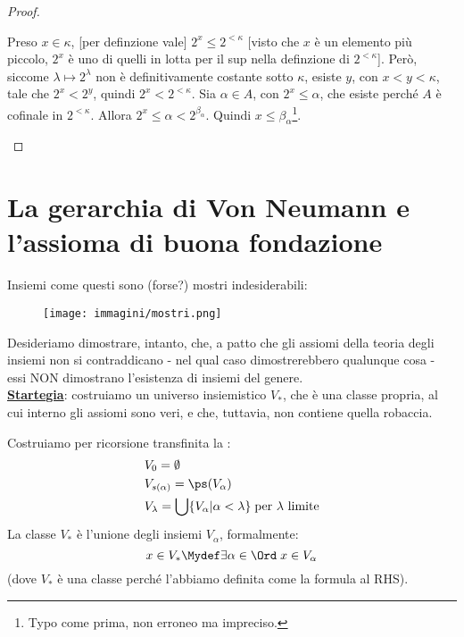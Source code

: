 \documentclass[11pt]{scrartcl}
\begin{document}
\begin{proof}
\begin{itemize}
\begin{itemize}
			Preso $x \in \kappa$, [per definzione vale] $2^{x} \leq 2^{<\kappa}$ [visto che $x$ è un elemento più piccolo, $2^x$ è uno di quelli in lotta per il sup nella definzione di $2^{<\kappa}$]. Però, siccome $\lambda \mapsto 2^\lambda$ non è definitivamente costante sotto $\kappa$, esiste $y$, con $x < y < \kappa$, tale che $2^x < 2^y$,
			quindi $2^{x} < 2^{<\kappa}$. Sia $\alpha \in A$, con $2^x \leq \alpha$, che esiste perché $A$ è cofinale in $2^{<\kappa}$. Allora $2^x \leq \alpha < 2^{\beta_\alpha}$. Quindi $x \leq \beta_\alpha$\footnote{Typo come prima, non erroneo ma impreciso.}.
		\end{itemize}
	\end{itemize}
\end{proof}


\pagebreak
\section{La gerarchia di Von Neumann e l'assioma di buona fondazione}
Insiemi come questi sono (forse?) mostri indesiderabili:

\begin{figure}[H]
	\centering\texttt{[image: immagini/mostri.png]}
\end{figure}

Desideriamo dimostrare, intanto, che, a patto che gli assiomi della teoria degli insiemi non si contraddicano - nel qual caso dimostrerebbero qualunque cosa - essi NON dimostrano l'esistenza di insiemi del genere.\\
\textbf{\underline{Startegia}}: costruiamo un universo insiemistico $V_*$, che è una classe propria, al cui interno gli assiomi sono veri, e che, tuttavia, non contiene quella robaccia.

\begin{definition}
	Costruiamo per ricorsione transfinita la :
	\begin{align*}
		&V_0 = \emptyset \\
		&V_{s(\alpha)} = \ps(V_\alpha) \\
		&V_\lambda = \bigcup\{V_\alpha | \alpha < \lambda\} \; \text{per $\lambda$ limite}
	\end{align*}
	La classe $V_*$ è l'unione degli insiemi $V_\alpha$, formalmente:
	\[ x \in V_* \Mydef \exists \alpha \in \Ord \; x \in V_\alpha
		\]
	(dove $V_*$ è una classe perché l'abbiamo definita come la formula al RHS).
\end{definition}
\end{document}
